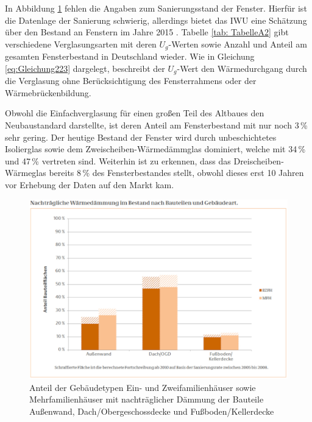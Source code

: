 In Abbildung \ref{fig: Abbildung231} fehlen die Angaben zum Sanierungsstand der Fenster.
Hierfür ist die Datenlage der Sanierung schwierig, allerdings bietet das IWU eine Schätzung über den Bestand an Fenstern im Jahre 2015 \cite{Bigalke.2016}.
Tabelle \ref{tab: TabelleA2} gibt verschiedene Verglasungsarten mit deren \(U_g\)-Werten sowie Anzahl und Anteil am gesamten Fensterbestand in Deutschland wieder.
Wie in Gleichung \ref{eq:Gleichung223} dargelegt, beschreibt der \(U_g\)-Wert den Wärmedurchgang durch die Verglasung ohne Berücksichtigung des Fensterrahmens oder der Wärmebrückenbildung.

Obwohl die Einfachverglasung für einen großen Teil des Altbaues den Neubaustandard darstellte, ist deren Anteil am Fensterbestand mit nur noch 3\,\% sehr gering. 
Der heutige Bestand der Fenster wird durch unbeschichtetes Isolierglas sowie dem Zweischeiben-Wärmedämmglas dominiert, welche mit 34\,\% und 47\,\% vertreten sind.
Weiterhin ist zu erkennen, dass das Dreischeiben-Wärmeglas bereits 8\,\% des Fensterbestandes stellt, obwohl dieses erst 10 Jahren vor Erhebung der Daten auf den Markt kam.

\begin{figure}[H]
	\centering
		\includegraphics{Pictures/NachtraeglicheSanierung.jpg}
	\caption{Anteil der Gebäudetypen Ein- und Zweifamilienhäuser sowie Mehrfamilienhäuser mit nachträglicher Dämmung der Bauteile Außenwand, Dach/Obergeschossdecke und Fußboden/Kellerdecke \cite{Bigalke.2016}}
	\label{fig: Abbildung231} 
\end{figure}


